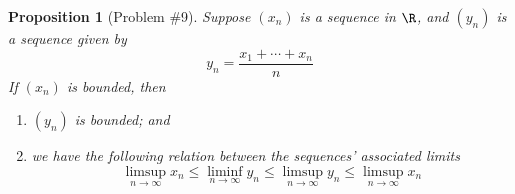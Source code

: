 \documentclass[11pt,letterpaper]{article}
\newtheorem{prop}{Proposition}
\begin{document}
\begin{prop}[Problem \#9]
  Suppose $(x_n)$ is a sequence in $\R$, and $(y_n)$ is a sequence given by
  \begin{equation*}
    y_n = \frac{x_1 + \cdots + x_n}{n}
  \end{equation*}
  If $(x_n)$ is bounded, then
  \begin{enumerate}
    \item $(y_n)$ is bounded; and
    \item we have the following relation between the sequences' associated
      limits
      \begin{equation*}
        \limsup_{n\to\infty}{x_n}
        \leq
        \liminf_{n\to\infty}{y_n}
        \leq
        \limsup_{n\to\infty}{y_n}
        \leq
        \limsup_{n\to\infty}{x_n}
      \end{equation*}
  \end{enumerate}
\end{prop}
\end{document}
